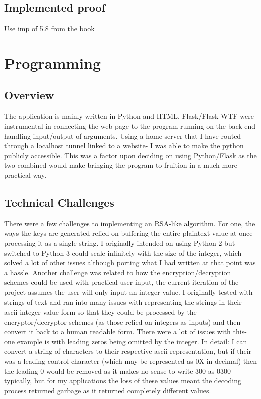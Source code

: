 \documentclass[a4paper]{article}
\begin{document}
\subsection{Implemented proof}

Use imp of 5.8 from the book

\section{Programming}
\subsection{Overview}
The application is mainly written in Python and HTML. Flask/Flask-WTF were instrumental in connecting the web page to the program running on the back-end handling input/output of arguments.
Using a home server that I have routed through a localhost tunnel linked to a website- I was able to make the python publicly accessible. This was a factor upon deciding on using Python/Flask as the two combined would make bringing the program to fruition in a much more practical way. 
\subsection{Technical Challenges}
There were a few challenges to implementing an RSA-like algorithm. For one, the ways the keys are generated relied on buffering the entire plaintext value at once processing it as a single string. I originally intended on using Python 2 but switched to Python 3 could scale infinitely with the size of the integer, which solved a lot of other issues although porting what I had written at that point was a hassle. 
Another challenge was related to how the encryption/decryption schemes could be used with practical user input, the current iteration of the project assumes the user will only input an integer value. I originally tested with strings of text and ran into many issues with representing the strings in their ascii integer value form so that they could be processed by the encryptor/decryptor schemes (as those relied on integers as inputs) and then convert it back to a human readable form. There were a lot of issues with this- one example is with leading zeros being omitted by the integer. In detail: I can convert a string of characters to their respective ascii representation, but if their was a leading control character (which may be represented as 0X in decimal) then the leading 0 would be removed as it makes no sense to write 300 as 0300 typically, but for my applications the loss of these values meant the decoding process returned garbage as it returned completely different values. 
\end{document}
